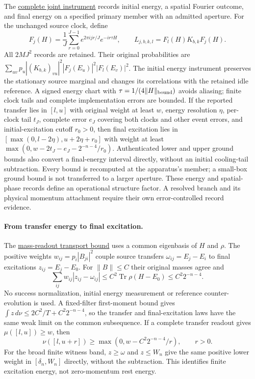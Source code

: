 The \href{https://github.com/FloatingPragma/observer-patch-holography/blob/main/model/particle_primary_joint_spectroscopy/PROOF.md}{complete joint instrument}
records initial energy, a spatial Fourier outcome, and final energy on
a specified primary member with an admitted aperture. For the unchanged
source clock, define
\[
 F_j(H)=\frac1J\sum_{r=0}^{J-1}e^{2\pi i jr/J}e^{-ir\tau H},
 \qquad L_{j,b,k,l}=F_l(H)K_{b,k}F_j(H).
\]
All $2MJ^2$ records are retained. Their original probabilities are
$\sum_{uv}p_u|(K_{b,k})_{vu}|^2|F_j(E_u)|^2|F_l(E_v)|^2$.
The initial energy instrument preserves the stationary source marginal
and changes its correlations with the retained idle reference. A signed
energy chart with $\tau=1/(4\|H\|_{\rm bound})$ avoids aliasing;
finite clock tails and complete implementation errors are bounded.
If the reported transfer lies in $[l,u]$ with original weight at least
$w$, energy resolution $\eta$, per-clock tail $t_J$, complete error
$e_J$ covering both clocks and other event errors, and
initial-excitation cutoff $r_0>0$, then final excitation lies
in $[\max(0,l-2\eta),u+2\eta+r_0]$ with weight at least
$\max(0,w-2t_J-e_J-2^{-n-4}/r_0)$.
Authenticated lower and upper ground bounds also convert a final-energy
interval directly, without an initial cooling-tail subtraction. Every
bound is recomputed at the apparatus's member; a small-box ground bound
is not transferred to a larger aperture. These energy and spatial-phase
records define an operational structure factor. A resolved branch and
its physical momentum attachment require their own error-controlled
record evidence.

\paragraph{From transfer energy to final excitation.}
The \href{https://github.com/FloatingPragma/observer-patch-holography/blob/main/model/particle_primary_mass_readout/PROOF.md}{mass-readout transport bound}
uses a common eigenbasis of $H$ and $\rho$. The positive weights
$w_{ij}=p_i|B_{ji}|^2$ couple source transfers
$\omega_{ij}=E_j-E_i$ to final excitations $z_{ij}=E_j-E_0$.
For $\|B\|\le C$ their original masses agree and
\[
 \sum_{ij}w_{ij}|z_{ij}-\omega_{ij}|
 \le C^2\operatorname{Tr}\rho(H-E_0)
 \le C^2 2^{-n-4}.
\]
No success normalization, initial energy measurement or reference
counter-evolution is used. A fixed-filter first-moment bound gives
$\int z\,d\nu\le2C^2/T+C^2 2^{-n-4}$, so the transfer and
final-excitation laws have the same weak limit on the common subsequence.
If a complete transfer readout gives $\mu([l,u])\ge w$, then
\[
 \nu([l,u+r])\ge
 \max(0,w-C^2 2^{-n-4}/r),\qquad r>0.
\]
For the broad finite witness band, $z\ge\omega$ and $z\le W_n$
give the same positive lower weight in $[\delta_n,W_n]$ directly,
without the subtraction. This identifies finite excitation energy,
not zero-momentum rest energy.

